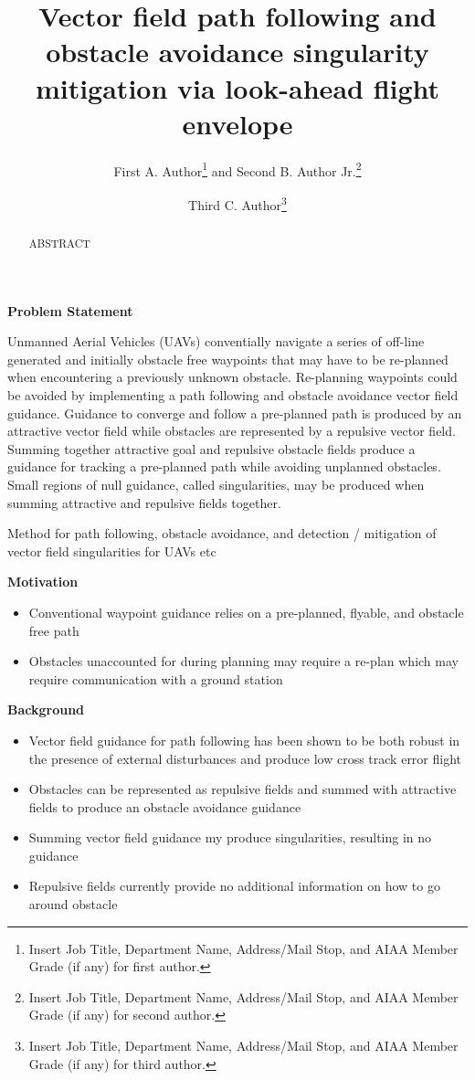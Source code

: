 \documentclass[conf]{new-aiaa}
\title{Vector field  path following and obstacle avoidance singularity mitigation via look-ahead flight envelope}
\author{First A. Author\footnote{Insert Job Title, Department Name, Address/Mail Stop, and AIAA Member Grade (if any) for first author.} and Second B. Author Jr.\footnote{Insert Job Title, Department Name, Address/Mail Stop, and AIAA Member Grade (if any) for second author.}}
\affil{Business or Academic Affiliation 1, City, State, Zip Code}
\author{Third C. Author\footnote{Insert Job Title, Department Name, Address/Mail Stop, and AIAA Member Grade (if any) for third author.}}
\begin{document}
\maketitle

\begin{abstract}
ABSTRACT
\end{abstract}

\textbf{Problem Statement} 

Unmanned Aerial Vehicles (UAVs) conventially navigate a series of off-line generated and initially obstacle free waypoints that may have to be re-planned when encountering a previously unknown obstacle. Re-planning waypoints could be avoided by implementing a path following and obstacle avoidance vector field guidance. Guidance to converge and follow a pre-planned path is produced by an attractive vector field while obstacles are represented by a repulsive vector field. Summing together attractive goal and repulsive obstacle fields produce a guidance for tracking a pre-planned path while avoiding unplanned obstacles. Small regions of null guidance, called singularities, may be produced when summing attractive and repulsive fields together. 

Method for path following, obstacle avoidance, and detection / mitigation of vector field singularities for UAVs etc



 





\textbf{Motivation}
\begin{itemize}
	\item Conventional waypoint guidance relies on a pre-planned, flyable, and obstacle free path 
	\item Obstacles unaccounted for during planning may require a re-plan which may require communication with a ground station
\end{itemize}


\textbf{Background}
\begin{itemize}
	\item Vector field guidance for path following has been shown to be both robust in the presence of external disturbances and produce low cross track error flight
	\item Obstacles can be represented as repulsive fields and summed with attractive fields to produce an obstacle avoidance guidance
	\item  Summing vector field guidance my produce singularities, resulting in no guidance
	\item Repulsive fields currently provide no additional information on how to go around obstacle
\end{itemize}
\end{document}
